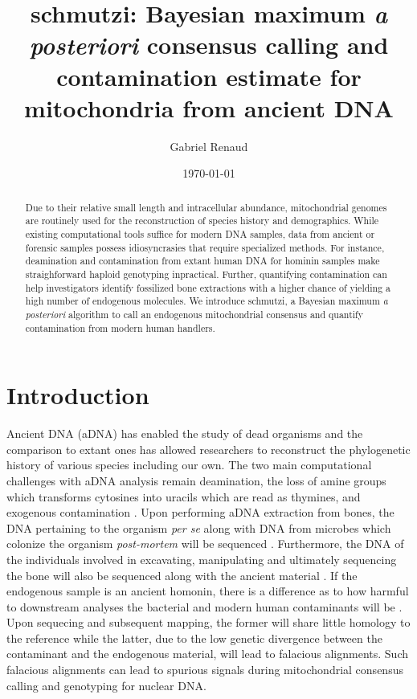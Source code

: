 \documentclass[a4paper,12pt]{article}
\begin{document}
\title{schmutzi: Bayesian maximum {\it a posteriori} consensus calling and contamination estimate for mitochondria from ancient DNA }
\date{\today}
\author{Gabriel Renaud}

\maketitle

\tableofcontents
\begin{abstract}
Due to their relative small length and intracellular abundance, mitochondrial genomes are routinely used for the reconstruction of species history and demographics. While existing computational tools suffice for modern DNA samples, data from ancient or forensic samples possess idiosyncrasies that require specialized methods. For instance, deamination and contamination from extant human DNA for hominin samples make straighforward haploid genotyping inpractical. Further, quantifying contamination can help investigators identify fossilized  bone extractions with a higher chance of yielding a high number of endogenous molecules. We introduce schmutzi, a Bayesian maximum {\it a posteriori} algorithm to call an endogenous mitochondrial consensus and quantify contamination from modern human handlers. 
\end{abstract}

\section{Introduction}

Ancient DNA (aDNA) has enabled the study of dead organisms and the comparison to extant ones has allowed researchers to reconstruct the phylogenetic history of various species including our own. The two main computational challenges with aDNA analysis remain deamination, the loss of amine groups which transforms cytosines into uracils which are read as thymines, and exogenous contamination \cite{briggs2007patterns}. Upon performing aDNA extraction from bones, the DNA pertaining to the organism {\it per se} along with DNA from microbes which colonize the organism {\it post-mortem} will be sequenced \cite{sidow1991bacterial,handt1994ancient}. Furthermore, the DNA of the individuals involved in excavating, manipulating and ultimately sequencing the bone will also be sequenced along with the ancient material \cite{bandelt2005mosaics}. If the endogenous sample is an ancient homonin, there is a difference as to how harmful to downstream analyses the bacterial and modern human contaminants will be . Upon sequecing and subsequent mapping, the former will share little homology to the reference while the latter, due to the low genetic divergence between the contaminant and the endogenous material, will lead to falacious alignments. Such falacious alignments can lead to spurious signals during mitochondrial consensus calling and genotyping for nuclear DNA. 
\end{document}
